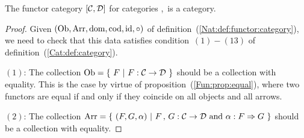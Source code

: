 \begin{prop}\label{Nat:prop:functor:category}
    The functor category $[\mbox{$\cal C$},\mbox{$\cal D$}]$ for categories \Cat,\Dat\ is a 
    category.
\end{prop}
\begin{proof}
    Given $(\mbox{\rm Ob}, \mbox{\rm Arr}, \mbox{\rm dom}, \mbox{\rm cod}, \mbox{\rm id}, \circ)$ of
    definition~(\ref{Nat:def:functor:category}), we need to check that this
    data satisfies condition~$(1)-(13)$ of definition~(\ref{Cat:def:category}).

    $(1)$: The collection $\ob=\{\ F\ |\ F:\Cat\to\Dat\ \}$ should be a
    collection with equality. This is the case by virtue of 
    proposition~(\ref{Fun:prop:equal}), where two functors are equal if 
    and only if they coincide on all objects and all arrows.

    $(2)$: The collection $\arr=\{\ (F,G,\alpha)\ |\ F\,,\,G:\Cat\to\Dat\ 
    \mbox{and}\ \alpha:F\Rightarrow G\ \}$ should be a collection
    with equality.

\end{proof}

